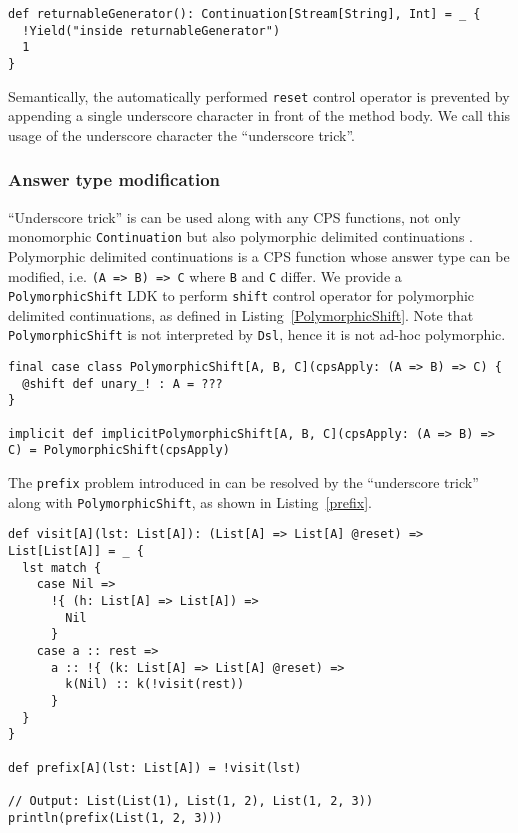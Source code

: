 \begin{lstlisting}[caption={Returning an additional value in LDK-based generators, written in the underscore trick},label={returnableGenerator-underscore}]
def returnableGenerator(): Continuation[Stream[String], Int] = _ {
  !Yield("inside returnableGenerator")
  1
}
\end{lstlisting}

Semantically, the automatically performed \lstinline{reset} control operator is prevented by appending a single underscore character in front of the method body. We call this usage of the underscore character the ``underscore trick''.

\subsubsection{Answer type modification}\label{Answer type modification}

``Underscore trick'' is can be used along with any CPS functions, not only monomorphic \lstinline{Continuation} but also polymorphic delimited continuations \cite{asai2007polymorphic}. Polymorphic delimited continuations is a CPS function whose answer type can be modified, i.e. \lstinline{(A => B) => C} where \lstinline{B} and \lstinline{C} differ. We provide a \lstinline{PolymorphicShift} LDK to perform \lstinline{shift} control operator for polymorphic delimited continuations, as defined in Listing~\ref{PolymorphicShift}. Note that \lstinline{PolymorphicShift} is not interpreted by \lstinline{Dsl}, hence it is not ad-hoc polymorphic.

\begin{lstlisting}[caption={The definition of PolymorphicShift},label={PolymorphicShift}]
final case class PolymorphicShift[A, B, C](cpsApply: (A => B) => C) {
  @shift def unary_! : A = ???
}

implicit def implicitPolymorphicShift[A, B, C](cpsApply: (A => B) => C) = PolymorphicShift(cpsApply)  
\end{lstlisting}

The \lstinline{prefix} problem introduced in \cite{asai2007polymorphic} can be resolved by the ``underscore trick'' along with \lstinline{PolymorphicShift}, as shown in Listing~\ref{prefix}.

\begin{lstlisting}[caption={The solution to \lstinline{prefix} problem by the ``underscore trick''},label={prefix}]
def visit[A](lst: List[A]): (List[A] => List[A] @reset) => List[List[A]] = _ {
  lst match {
    case Nil =>
      !{ (h: List[A] => List[A]) =>
        Nil
      }
    case a :: rest =>
      a :: !{ (k: List[A] => List[A] @reset) =>
        k(Nil) :: k(!visit(rest))
      }
  }
}

def prefix[A](lst: List[A]) = !visit(lst)

// Output: List(List(1), List(1, 2), List(1, 2, 3))
println(prefix(List(1, 2, 3)))
\end{lstlisting}

